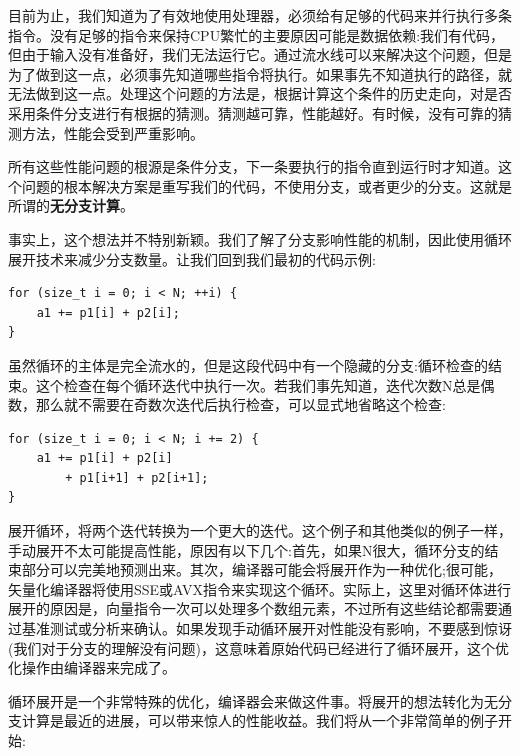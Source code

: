 
目前为止，我们知道为了有效地使用处理器，必须给有足够的代码来并行执行多条指令。没有足够的指令来保持CPU繁忙的主要原因可能是数据依赖:我们有代码，但由于输入没有准备好，我们无法运行它。通过流水线可以来解决这个问题，但是为了做到这一点，必须事先知道哪些指令将执行。如果事先不知道执行的路径，就无法做到这一点。处理这个问题的方法是，根据计算这个条件的历史走向，对是否采用条件分支进行有根据的猜测。猜测越可靠，性能越好。有时候，没有可靠的猜测方法，性能会受到严重影响。

所有这些性能问题的根源是条件分支，下一条要执行的指令直到运行时才知道。这个问题的根本解决方案是重写我们的代码，不使用分支，或者更少的分支。这就是所谓的\textbf{无分支计算}。


事实上，这个想法并不特别新颖。我们了解了分支影响性能的机制，因此使用循环展开技术来减少分支数量。让我们回到我们最初的代码示例:

\begin{lstlisting}[style=styleCXX]
for (size_t i = 0; i < N; ++i) {
	a1 += p1[i] + p2[i];
}
\end{lstlisting}

虽然循环的主体是完全流水的，但是这段代码中有一个隐藏的分支:循环检查的结束。这个检查在每个循环迭代中执行一次。若我们事先知道，迭代次数N总是偶数，那么就不需要在奇数次迭代后执行检查，可以显式地省略这个检查:

\begin{lstlisting}[style=styleCXX]
for (size_t i = 0; i < N; i += 2) {
	a1 += p1[i] + p2[i]
		+ p1[i+1] + p2[i+1];
}
\end{lstlisting}

展开循环，将两个迭代转换为一个更大的迭代。这个例子和其他类似的例子一样，手动展开不太可能提高性能，原因有以下几个:首先，如果N很大，循环分支的结束部分可以完美地预测出来。其次，编译器可能会将展开作为一种优化;很可能，矢量化编译器将使用SSE或AVX指令来实现这个循环。实际上，这里对循环体进行展开的原因是，向量指令一次可以处理多个数组元素，不过所有这些结论都需要通过基准测试或分析来确认。如果发现手动循环展开对性能没有影响，不要感到惊讶(我们对于分支的理解没有问题)，这意味着原始代码已经进行了循环展开，这个优化操作由编译器来完成了。


循环展开是一个非常特殊的优化，编译器会来做这件事。将展开的想法转化为无分支计算是最近的进展，可以带来惊人的性能收益。我们将从一个非常简单的例子开始:


